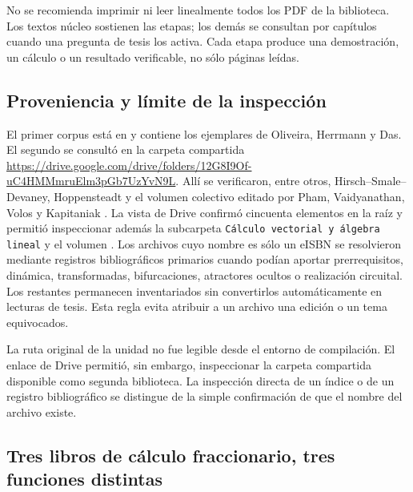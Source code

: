 \begin{remark}
No se recomienda imprimir ni leer linealmente todos los PDF de la biblioteca.
Los textos núcleo sostienen las etapas; los demás se consultan por capítulos
cuando una pregunta de tesis los activa. Cada etapa produce una demostración,
un cálculo o un resultado verificable, no sólo páginas leídas.
\end{remark}

\subsection{Proveniencia y límite de la inspección}

El primer corpus está en
 y contiene los ejemplares de
Oliveira, Herrmann y Das. El segundo se consultó en la carpeta compartida
\url{https://drive.google.com/drive/folders/12G8I9Of-uC4HMMmruElm3pGb7UzYvN9L}.
Allí se verificaron, entre otros, Hirsch--Smale--Devaney,
Hoppensteadt y el volumen colectivo editado por Pham, Vaidyanathan, Volos y
Kapitaniak \cite{HirschSmaleDevaney2013,Hoppensteadt2000Chaotic,
PhamEtAl2018HiddenAttractors}. La vista de Drive confirmó cincuenta elementos
en la raíz y permitió inspeccionar además la subcarpeta
\texttt{Cálculo vectorial y álgebra lineal} y el volumen
. Los archivos cuyo
nombre es sólo un eISBN se resolvieron mediante registros bibliográficos primarios
cuando podían aportar prerrequisitos, dinámica, transformadas,
bifurcaciones, atractores ocultos o realización circuital. Los restantes
permanecen inventariados sin convertirlos automáticamente en lecturas de
tesis. Esta regla evita atribuir a un archivo una edición o un tema
equivocados.

La ruta original de la unidad  no fue legible desde el entorno de
compilación. El enlace de Drive permitió, sin embargo, inspeccionar la carpeta
compartida disponible como segunda biblioteca. La inspección
directa de un índice o de un registro bibliográfico se distingue de la simple
confirmación de que el nombre del archivo existe.

\subsection{Tres libros de cálculo fraccionario, tres funciones distintas}

